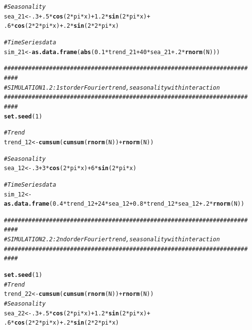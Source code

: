 \documentclass{article}\usepackage[]{graphicx}\usepackage[]{color}
\makeatletter
\newcommand{\hlnum}[1]{\textcolor[rgb]{0.686,0.059,0.569}{#1}}%
\newcommand{\hlcom}[1]{\textcolor[rgb]{0.678,0.584,0.686}{\textit{#1}}}%
\newcommand{\hlopt}[1]{\textcolor[rgb]{0,0,0}{#1}}%
\newcommand{\hlstd}[1]{\textcolor[rgb]{0.345,0.345,0.345}{#1}}%
\newcommand{\hlkwb}[1]{\textcolor[rgb]{0.69,0.353,0.396}{#1}}%
\newcommand{\hlkwd}[1]{\textcolor[rgb]{0.737,0.353,0.396}{\textbf{#1}}}%
\newenvironment{kframe}{%
 \def\at@end@of@kframe{}%
 \ifinner\ifhmode%
  \def\at@end@of@kframe{\end{minipage}}%
  \begin{minipage}{\columnwidth}%
 \fi\fi%
 \def\FrameCommand##1{\hskip\@totalleftmargin \hskip-\fboxsep
 \colorbox{shadecolor}{##1}\hskip-\fboxsep
     \hskip-\linewidth \hskip-\@totalleftmargin \hskip\columnwidth}%
 \MakeFramed {\advance\hsize-\width
   \@totalleftmargin\z@ \linewidth\hsize
   \@setminipage}}%
 {\par\unskip\endMakeFramed%
 \at@end@of@kframe}
\newenvironment{knitrout}{}{} %
\makeatother
\begin{document}
\begin{knitrout}
\begin{kframe}
\begin{alltt}
\hlcom{# Seasonality}
\hlstd{sea_21} \hlkwb{<-} \hlnum{.3} \hlopt{+} \hlnum{.5}\hlopt{*}\hlkwd{cos}\hlstd{(}\hlnum{2}\hlopt{*}\hlstd{pi}\hlopt{*}\hlstd{x)} \hlopt{+} \hlnum{1.2}\hlopt{*}\hlkwd{sin}\hlstd{(}\hlnum{2}\hlopt{*}\hlstd{pi}\hlopt{*}\hlstd{x)} \hlopt{+}
  \hlnum{.6}\hlopt{*}\hlkwd{cos}\hlstd{(}\hlnum{2}\hlopt{*}\hlnum{2}\hlopt{*}\hlstd{pi}\hlopt{*}\hlstd{x)} \hlopt{+} \hlnum{.2}\hlopt{*}\hlkwd{sin}\hlstd{(}\hlnum{2}\hlopt{*}\hlnum{2}\hlopt{*}\hlstd{pi}\hlopt{*}\hlstd{x)}

\hlcom{# Time Series data}
\hlstd{sim_21} \hlkwb{<-} \hlkwd{as.data.frame}\hlstd{(}\hlkwd{abs}\hlstd{(}\hlnum{0.1}\hlopt{*}\hlstd{trend_21} \hlopt{+} \hlnum{40}\hlopt{*}\hlstd{sea_21} \hlopt{+} \hlnum{.2}\hlopt{*}\hlkwd{rnorm}\hlstd{(N)))}


\hlcom{##########################################################################}
\hlcom{# SIMULATION 1.2: 1st order Fourier trend, seasonality with interaction}
\hlcom{##########################################################################}
\hlkwd{set.seed}\hlstd{(}\hlnum{1}\hlstd{)}

\hlcom{# Trend}
\hlstd{trend_12} \hlkwb{<-} \hlkwd{cumsum}\hlstd{(}\hlkwd{cumsum}\hlstd{(}\hlkwd{rnorm}\hlstd{(N))}\hlopt{+}\hlkwd{rnorm}\hlstd{(N))}

\hlcom{# Seasonality}
\hlstd{sea_12} \hlkwb{<-} \hlnum{.3} \hlopt{+} \hlnum{3}\hlopt{*}\hlkwd{cos}\hlstd{(}\hlnum{2}\hlopt{*}\hlstd{pi}\hlopt{*}\hlstd{x)} \hlopt{+} \hlnum{6}\hlopt{*}\hlkwd{sin}\hlstd{(}\hlnum{2}\hlopt{*}\hlstd{pi}\hlopt{*}\hlstd{x)}

\hlcom{# Time Series data}
\hlstd{sim_12} \hlkwb{<-} \hlkwd{as.data.frame}\hlstd{(}\hlnum{0.4}\hlopt{*}\hlstd{trend_12} \hlopt{+} \hlnum{24}\hlopt{*}\hlstd{sea_12} \hlopt{+} \hlnum{0.8}\hlopt{*}\hlstd{trend_12}\hlopt{*}\hlstd{sea_12} \hlopt{+} \hlnum{.2}\hlopt{*}\hlkwd{rnorm}\hlstd{(N))}


\hlcom{##########################################################################}
\hlcom{# SIMULATION 2.2: 2nd order Fourier trend, seasonality with interaction}
\hlcom{##########################################################################}

\hlkwd{set.seed}\hlstd{(}\hlnum{1}\hlstd{)}
\hlcom{# Trend}
\hlstd{trend_22} \hlkwb{<-} \hlkwd{cumsum}\hlstd{(}\hlkwd{cumsum}\hlstd{(}\hlkwd{rnorm}\hlstd{(N))}\hlopt{+}\hlkwd{rnorm}\hlstd{(N))}
\hlcom{# Seasonality}
\hlstd{sea_22} \hlkwb{<-} \hlnum{.3} \hlopt{+} \hlnum{.5}\hlopt{*}\hlkwd{cos}\hlstd{(}\hlnum{2}\hlopt{*}\hlstd{pi}\hlopt{*}\hlstd{x)} \hlopt{+} \hlnum{1.2}\hlopt{*}\hlkwd{sin}\hlstd{(}\hlnum{2}\hlopt{*}\hlstd{pi}\hlopt{*}\hlstd{x)} \hlopt{+}
  \hlnum{.6}\hlopt{*}\hlkwd{cos}\hlstd{(}\hlnum{2}\hlopt{*}\hlnum{2}\hlopt{*}\hlstd{pi}\hlopt{*}\hlstd{x)} \hlopt{+} \hlnum{.2}\hlopt{*}\hlkwd{sin}\hlstd{(}\hlnum{2}\hlopt{*}\hlnum{2}\hlopt{*}\hlstd{pi}\hlopt{*}\hlstd{x)}


\end{alltt}
\end{kframe}
\end{knitrout}
\end{document}
